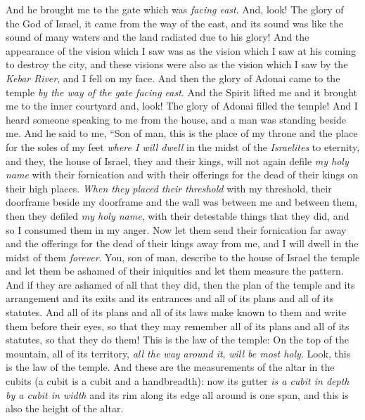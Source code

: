 \begin{biblechapter} %
 And he brought me to the gate which was \textit{facing east}.
\verse And, look! The glory of the God of Israel, it came from the way of the east, and its sound was like the sound of many waters and the land radiated due to his glory!
\verse And the appearance of the vision which I saw was as the vision which I saw at his coming to destroy the city, and these visions were also as the vision which I saw by the \textit{Kebar River}, and I fell on my face.
\verse And then the glory of Adonai came to the temple \textit{by the way of the gate facing east}.
\verse And the Spirit lifted me and it brought me to the inner courtyard and, look! The glory of Adonai filled the temple!
\verse And I heard someone speaking to me from the house, and a man was standing beside me.
\verse And he said to me, “Son of man, this is the place of my throne and the place for the soles of my feet \textit{where I will dwell} in the midst of the \textit{Israelites} to eternity, and they, the house of Israel, they and their kings, will not again defile \textit{my holy name} with their fornication and with their offerings for the dead of their kings on their high places.
\verse \textit{When they placed their threshold} with my threshold, their doorframe beside my doorframe and the wall was between me and between them, then they defiled \textit{my holy name}, with their detestable things that they did, and so I consumed them in my anger.
\verse Now let them send their fornication far away and the offerings for the dead of their kings away from me, and I will dwell in the midst of them \textit{forever}.
\verse You, son of man, describe to the house of Israel the temple and let them be ashamed of their iniquities and let them measure the pattern.
\verse And if they are ashamed of all that they did, then the plan of the temple and its arrangement and its exits and its entrances and all of its plans and all of its statutes. And all of its plans and all of its laws make known to them and write them before their eyes, so that they may remember all of its plans and all of its statutes, so that they do them!
\verse This is the law of the temple: On the top of the mountain, all of its territory, \textit{all the way around it}, \textit{will be most holy}. Look, this is the law of the temple.
\verse And these are the measurements of the altar in the cubits (a cubit is a cubit and a handbreadth): now its gutter \textit{is a cubit in depth by a cubit in width} and its rim along its edge all around is one span, and this is also the height of the altar.

\end{biblechapter}
